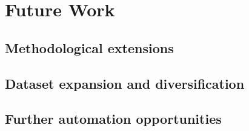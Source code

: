 \chapter{Future Work}
\section{Methodological extensions}
\section{Dataset expansion and diversification}
\section{Further automation opportunities}